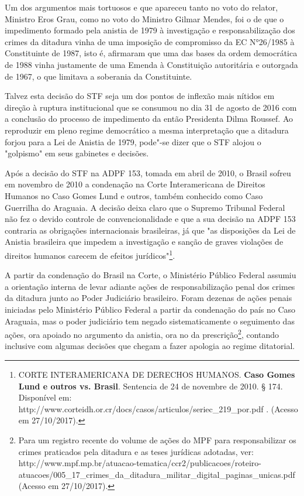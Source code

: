 Um dos argumentos mais tortuosos e que apareceu tanto no voto do
relator, Ministro Eros Grau, como no voto do Ministro Gilmar Mendes, foi
o de que o impedimento formado pela anistia de 1979 à investigação e
responsabilização dos crimes da ditadura vinha de uma imposição de
compromisso da EC N°26/1985 à Constituinte de 1987, isto é, afirmaram
que uma das bases da ordem democrática de 1988 vinha justamente de uma
Emenda à Constituição autoritária e outorgada de 1967, o que limitava a
soberania da Constituinte.

Talvez esta decisão do STF seja um dos pontos de inflexão mais nítidos
em direção à ruptura institucional que se consumou no dia 31 de agosto
de 2016 com a conclusão do processo de impedimento da então Presidenta
Dilma Roussef. Ao reproduzir em pleno regime democrático a mesma
interpretação que a ditadura forjou para a Lei de Anistia de 1979,
pode"-se dizer que o STF alojou o "golpismo" em seus gabinetes e
decisões.

Após a decisão do STF na ADPF 153, tomada em abril de 2010, o Brasil
sofreu em novembro de 2010 a condenação na Corte Interamericana de
Direitos Humanos no Caso Gomes Lund e outros, também conhecido como Caso
Guerrilha do Araguaia. A decisão deixa claro que o Supremo Tribunal
Federal não fez o devido controle de convencionalidade e que a sua
decisão na ADPF 153 contraria as obrigações internacionais brasileiras,
já que "as disposições da Lei de Anistia brasileira que impedem a
investigação e sanção de graves violações de direitos humanos carecem de
efeitos jurídicos"\footnote{CORTE INTERAMERICANA DE DERECHOS HUMANOS.
  \textbf{Caso Gomes Lund e outros vs. Brasil}. Sentencia de 24 de
  novembre de 2010. § 174. Disponível em:
  http://www.corteidh.or.cr/docs/casos/articulos/seriec\_219\_por.pdf .
  (Acesso em 27/10/2017).}.

A partir da condenação do Brasil na Corte, o Ministério Público Federal
assumiu a orientação interna de levar adiante ações de responsabilização
penal dos crimes da ditadura junto ao Poder Judiciário brasileiro. Foram
dezenas de ações penais iniciadas pelo Ministério Público Federal a
partir da condenação do país no Caso Araguaia, mas o poder judiciário
tem negado sistematicamente o seguimento das ações, ora apoiado no
argumento da anistia, ora no da prescrição\footnote{Para um registro
  recente do volume de ações do MPF para responsabilizar os crimes
  praticados pela ditadura e as teses jurídicas adotadas, ver:
  http://www.mpf.mp.br/atuacao-tematica/ccr2/publicacoes/roteiro-atuacoes/005\_17\_crimes\_da\_ditadura\_militar\_digital\_paginas\_unicas.pdf
  (Acesso em 27/10/2017).}, contando inclusive com algumas decisões que
chegam a fazer apologia ao regime ditatorial.

